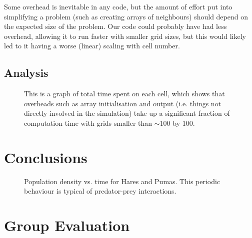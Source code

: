 \documentclass[11pt]{report}
\begin{document}
   Some overhead is inevitable in any code, but the amount of effort put into simplifying a problem (such as creating arrays of neighbours)
   should depend on the expected size of the problem. Our code could probably have had less overhead, allowing it to run faster with smaller grid sizes,
   but this would likely led to it having a worse (linear) scaling with cell number.
   
   
   
   \section{Analysis} %
   
   \begin{figure}[h]
   
   
   \caption{\label{overhead}This is a graph of total time spent on each cell, which shows that overheads such as array initialisation
   and output (i.e. things not directly involved in the simulation) take up a significant fraction of computation
   time with grids smaller than $\sim$100 by 100.}
   \end{figure}

  




\chapter{Conclusions} %

   \begin{figure}[h]
   
   
   \caption{Population density vs. time for Hares and Pumas. This periodic behaviour is typical of predator-prey interactions.}
   \end{figure}

\chapter{Group Evaluation} %
\end{document}
